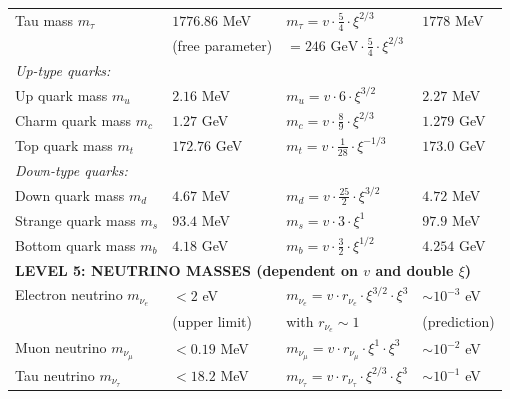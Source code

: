 \begin{longtable}{p{4.0cm}p{3.2cm}p{2.8cm}p{2.8cm}}
	Tau mass $m_\tau$ & $1776.86$ MeV & $m_\tau = v \cdot \frac{5}{4} \cdot \xi^{2/3}$ & $1778$ MeV \\
	& (free parameter) & $= 246 \text{ GeV} \cdot \frac{5}{4} \cdot \xi^{2/3}$ & \\[0.3em]
	
	\multicolumn{4}{l}{\textit{Up-type quarks:}} \\
	
	Up quark mass $m_u$ & $2.16$ MeV & $m_u = v \cdot 6 \cdot \xi^{3/2}$ & $2.27$ MeV \\
	
	Charm quark mass $m_c$ & $1.27$ GeV & $m_c = v \cdot \frac{8}{9} \cdot \xi^{2/3}$ & $1.279$ GeV \\
	
	Top quark mass $m_t$ & $172.76$ GeV & $m_t = v \cdot \frac{1}{28} \cdot \xi^{-1/3}$ & $173.0$ GeV \\
	
	\multicolumn{4}{l}{\textit{Down-type quarks:}} \\
	
	Down quark mass $m_d$ & $4.67$ MeV & $m_d = v \cdot \frac{25}{2} \cdot \xi^{3/2}$ & $4.72$ MeV \\
	
	Strange quark mass $m_s$ & $93.4$ MeV & $m_s = v \cdot 3 \cdot \xi^1$ & $97.9$ MeV \\
	
	Bottom quark mass $m_b$ & $4.18$ GeV & $m_b = v \cdot \frac{3}{2} \cdot \xi^{1/2}$ & $4.254$ GeV \\
	
	\midrule
	\multicolumn{4}{l}{\textbf{LEVEL 5: NEUTRINO MASSES (dependent on $v$ and double $\xi$)}} \\
	\midrule
	
	Electron neutrino $m_{\nu_e}$ & $< 2$ eV & $m_{\nu_e} = v \cdot r_{\nu_e} \cdot \xi^{3/2} \cdot \xi^3$ & $\sim 10^{-3}$ eV \\
	& (upper limit) & with $r_{\nu_e} \sim 1$ & (prediction) \\[0.3em]
	
	Muon neutrino $m_{\nu_\mu}$ & $< 0.19$ MeV & $m_{\nu_\mu} = v \cdot r_{\nu_\mu} \cdot \xi^{1} \cdot \xi^3$ & $\sim 10^{-2}$ eV \\
	
	Tau neutrino $m_{\nu_\tau}$ & $< 18.2$ MeV & $m_{\nu_\tau} = v \cdot r_{\nu_\tau} \cdot \xi^{2/3} \cdot \xi^3$ & $\sim 10^{-1}$ eV \\
	

\end{longtable}
